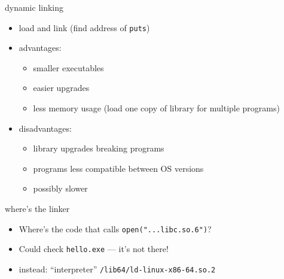 \begin{frame}{dynamic linking}
\begin{itemize}
    \item load and link (find address of {\tt puts}) 
    \item advantages:
        \begin{itemize}
        \item smaller executables
        \item easier upgrades
        \item less memory usage (load one copy of library for multiple programs)
        \end{itemize}
    \item disadvantages:
        \begin{itemize}
        \item library upgrades breaking programs
        \item programs less compatible between OS versions
        \item possibly slower
        \end{itemize}
\end{itemize}
\end{frame}

\begin{frame}{where's the linker}
\begin{itemize}
    \item Where's the code that calls {\tt open("...libc.so.6")}?
    \item Could check {\tt hello.exe} --- it's not there!
    \vspace{.5cm}
    \item<2> instead: ``interpreter'' {\tt /lib64/ld-linux-x86-64.so.2}
\end{itemize}
\end{frame}



